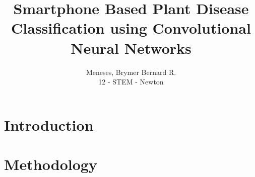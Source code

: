 \documentclass[a4paper, 12pt]{report}
\title{
    Smartphone Based Plant Disease Classification using
    Convolutional Neural Networks
}
\author{
    Meneses, Brymer Bernard R. \\[-4mm]
    {\small 12 - STEM - Newton}
}
\date{}
\begin{document}
 
    \maketitle 


    \tableofcontents

    \chapter{Introduction}
    
    
    \chapter{Methodology}
    
\end{document}
